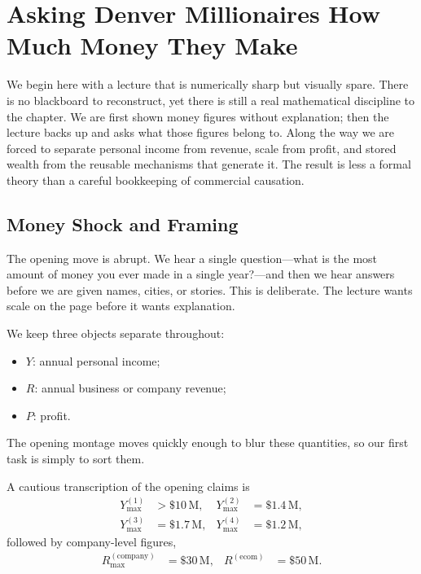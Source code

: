 \chapter{Asking Denver Millionaires How Much Money They Make}

We begin here with a lecture that is numerically sharp but visually spare. There is no blackboard to reconstruct, yet there is still a real mathematical discipline to the chapter. We are first shown money figures without explanation; then the lecture backs up and asks what those figures belong to. Along the way we are forced to separate personal income from revenue, scale from profit, and stored wealth from the reusable mechanisms that generate it. The result is less a formal theory than a careful bookkeeping of commercial causation.

\section{Money Shock and Framing}

The opening move is abrupt. We hear a single question---what is the most amount of money you ever made in a single year?---and then we hear answers before we are given names, cities, or stories. This is deliberate. The lecture wants scale on the page before it wants explanation.

\begin{definition}
We keep three objects separate throughout:
\begin{itemize}
\item \(Y\): annual personal income;
\item \(R\): annual business or company revenue;
\item \(P\): profit.
\end{itemize}
The opening montage moves quickly enough to blur these quantities, so our first task is simply to sort them.
\end{definition}

A cautious transcription of the opening claims is
\begin{align}
Y_{\max}^{(1)} &> \$10\,\mathrm{M}, &
Y_{\max}^{(2)} &= \$1.4\,\mathrm{M}, \\
Y_{\max}^{(3)} &= \$1.7\,\mathrm{M}, &
Y_{\max}^{(4)} &= \$1.2\,\mathrm{M},
\end{align}
followed by company-level figures,
\begin{align}
R_{\max}^{(\mathrm{company})} &= \$30\,\mathrm{M}, &
R^{(\mathrm{ecom})} &= \$50\,\mathrm{M}.
\end{align}

